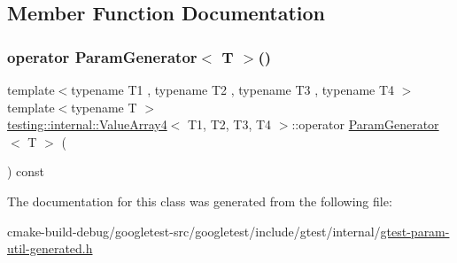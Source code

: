 \subsection{Member Function Documentation}
\mbox{\label{classtesting_1_1internal_1_1ValueArray4_aef21f582b20423f5fb8515d9879ad557}} 
\subsubsection{\texorpdfstring{operator ParamGenerator$<$ T $>$()}{operator ParamGenerator< T >()}}
{\footnotesize\ttfamily template$<$typename T1 , typename T2 , typename T3 , typename T4 $>$ \\
template$<$typename T $>$ \\
\mbox{\hyperlink{classtesting_1_1internal_1_1ValueArray4}{testing\+::internal\+::\+Value\+Array4}}$<$ T1, T2, T3, T4 $>$\+::operator \mbox{\hyperlink{classtesting_1_1internal_1_1ParamGenerator}{Param\+Generator}}$<$ T $>$ (\begin{DoxyParamCaption}{ }\end{DoxyParamCaption}) const\hspace{0.3cm}{\ttfamily [inline]}}



The documentation for this class was generated from the following file\+:\begin{DoxyCompactItemize}
\item 
cmake-\/build-\/debug/googletest-\/src/googletest/include/gtest/internal/\mbox{\hyperlink{gtest-param-util-generated_8h}{gtest-\/param-\/util-\/generated.\+h}}\end{DoxyCompactItemize}
